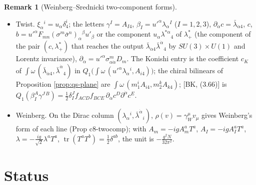 \documentclass[11pt]{article}
\numberwithin{equation}{section}
\theoremstyle{plain}
\theoremstyle{definition}
\newtheorem{remark}[theorem]{Remark}
\begin{document}
\begin{remark}[Weinberg--Srednicki two-component forms]
\begin{itemize}
\item Twist. $\xi_\alpha{}^i=u_\alpha\delta^i_4$; the letters $\gamma^I=A_{I4}$, $\beta_I=u'^\alpha\lambda_\alpha{}^I$ ($I=1,2,3$), $\partial_{\dot\alpha}c=\bar\lambda_{\dot\alpha4}$, $c$, $b=u'^\alpha F_{mn}(\sigma^m\bar\sigma^n)_\alpha{}^\beta u'_\beta$ or the component $u_\alpha\lambda^{*\alpha}{}_4$ of $\lambda^*_+$ (the component of the pair $(c,\lambda^*_+)$ that reaches the output $\bar\lambda_{\dot\alpha4}\bar\lambda^{\dot\alpha}{}_4$ by $SU(3)\times U(1)$ and Lorentz invariance), $\partial_{\dot\alpha}=u'^\alpha\sigma^m_{\alpha\dot\alpha}D_m$. The Konishi entry is the coefficient $c_K$ of $\int\omega\,(\bar\lambda_{\dot\alpha4},\bar\lambda^{\dot\alpha}{}_4)$ in $Q_1\big(\int\omega\,(u'^\alpha\lambda_\alpha{}^i,A_{i4})\big)$; the chiral bilinears of Proposition \ref{prop:qs-plane} are $\int\omega\,(m_1^iA_{i4},m_2^kA_{k4})$; [BK, (3.66)] is $Q_1(\beta_I^A\gamma^{J\,B})=\tfrac12\delta^J_If_{ACD}f_{BCE}\,\partial_{\dot\alpha}c^D\partial^{\dot\alpha}c^E$.
\item Weinberg. On the Dirac column $(\lambda_\alpha{}^i,\bar\lambda^{\dot\alpha}{}_i)$, $\rho(v)=\gamma_W^\mu v_\mu$ gives Weinberg's form of each line (Prop c8-twocomp); with $A_m=-igA^a_mT^a$, $A_I=-igA^a_IT^a$, $\lambda=-\tfrac{ig}{\sqrt2}\lambda^aT^a$, $\operatorname{tr}(T^aT^b)=\tfrac12\delta^{ab}$, the unit is $-\frac{g^2N}{32\pi^2}$.
\end{itemize}
\end{remark}

\section{Status}
\label{sec:qs-status}
\end{document}
